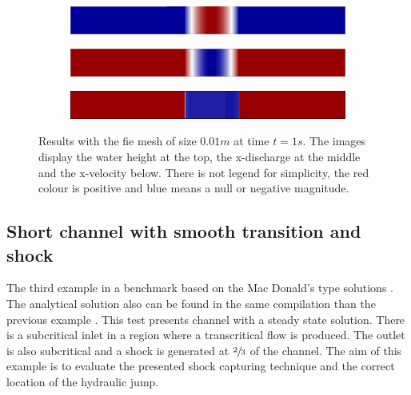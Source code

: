 \documentclass[a4paper,12pt]{article}
\begin{document}
\begin{figure}[H]
\begin{subfigure}{\textwidth}
    \includegraphics[width=\textwidth]{img/par/height_1.0.png}
\end{subfigure}
\par\medskip
\begin{subfigure}{\textwidth}
    \includegraphics[width=\textwidth]{img/par/momentum_1.0.png}
\end{subfigure}
\par\medskip
\begin{subfigure}{\textwidth}
    \includegraphics[width=\textwidth]{img/par/velocity_1.0.png}
\end{subfigure}
\caption{Results with the fie mesh of size $0.01m$ at time $t=1s$. The images display the water height at the top, the x-discharge at the middle and the x-velocity below. There is not legend for simplicity, the red colour is positive and blue means a null or negative magnitude.}
\label{parabola_results}
\end{figure}



\subsection{Short channel with smooth transition and shock}

The third example in a benchmark based on the Mac Donald's type solutions \cite{macdonald1997}. The analytical solution also can be found in the same compilation than the previous example \cite{delestre2013}. This test presents channel with a steady state solution. There is a subcritical inlet in a region where a transcritical flow is produced. The outlet is also subcritical and a shock is generated at $\sfrac{2}{3}$ of the channel. The aim of this example is to evaluate the presented shock capturing technique and the correct location of the hydraulic jump.
\end{document}
